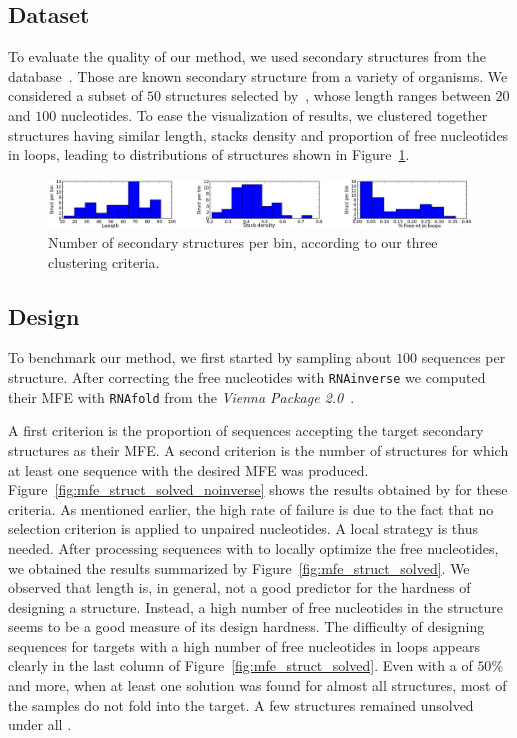 \subsection{Dataset}
To evaluate the quality of our method, we used secondary
structures from the \RNASTRAND database~\cite{andronescu2008rna}.
Those are known secondary structure from a variety of organisms.
We considered a subset of $50$ structures selected by~\cite{Levin:2012kx}, 
whose length ranges between $20$ and $100$ nucleotides. 
 To ease the visualization of results, we clustered together structures
 having similar length, stacks density and proportion of free nucleotides in loops, leading to distributions of structures shown in Figure~\ref{fig:bins}.

 \begin{figure}[ht!]
 	\centering
	\includegraphics[width=\textwidth]{Figures/bins_distribution.png}
	\caption{Number of secondary structures per bin, according to our three clustering criteria.}
	\label{fig:bins}
 \end{figure}
 
 
\subsection{Design}
 To benchmark our method, we first started by sampling about $100$ sequences per structure. After correcting the free nucleotides with
 \texttt{RNAinverse} we computed their MFE with \texttt{RNAfold} from the \textit{Vienna Package 2.0}~\cite{Hofacker:1994}.
 
A first criterion is the proportion of sequences accepting the target
secondary structures as their MFE. A second criterion is the number of structures
for which at least one sequence with the desired MFE was produced.
Figure~\ref{fig:mfe_struct_solved_noinverse} shows the results obtained by \ourprog for these criteria. As mentioned earlier, the high rate of failure
is due to the fact that no selection criterion is applied to
unpaired nucleotides. A local strategy is thus needed.
After processing \ourprog sequences with \RNAinverse to 
locally optimize the free nucleotides, we obtained the results 
summarized by Figure~\ref{fig:mfe_struct_solved}. We observed
that length is, in general, not a good predictor for the hardness of designing a structure. 
Instead, a high number of free nucleotides in the structure seems to be a 
good measure of its design hardness. 
 The difficulty of 
designing sequences for targets with a high number of free nucleotides 
 in loops appears clearly in the last column of Figure~\ref{fig:mfe_struct_solved}.
Even with a \GCContent of $50\%$ and more, when at least
one solution was found for almost all structures, most of the samples 
do not fold into the target. A few structures remained unsolved under
all \GCContent.


